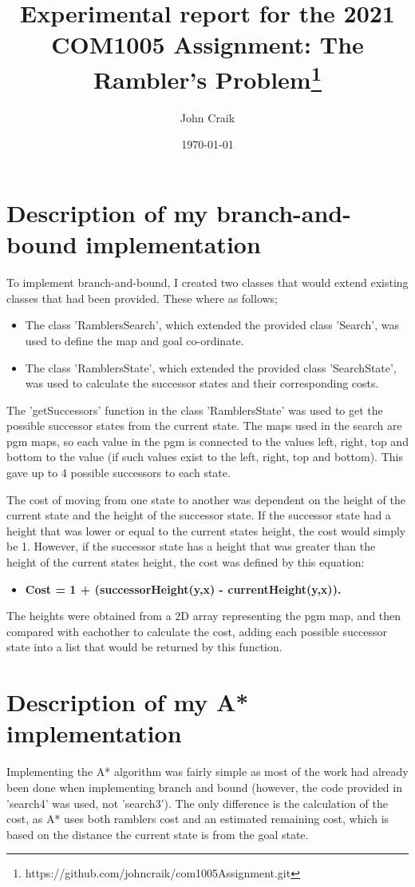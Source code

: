 \documentclass[11pt,oneside]{article}
\title{Experimental report for the 2021 COM1005 Assignment: The Rambler's Problem\footnote{https://github.com/johncraik/com1005Assignment.git}}
\author{John Craik}
\date{\today}
\begin{document}
\maketitle

\section{Description of my branch-and-bound implementation}
To implement branch-and-bound, I created two classes that would extend existing classes that had been provided. These where as follows;
\begin{itemize}
    \item The class 'RamblersSearch', which extended the provided class 'Search', was used to define the map and goal co-ordinate.
    \item The class 'RamblersState', which extended the provided class 'SearchState', was used to calculate the successor states and their corresponding costs.
\end{itemize}
The 'getSuccessors' function in the class 'RamblersState' was used to get the possible successor states from the current state. The maps used in the search are pgm maps, so each value in the pgm is connected to the values left, right, top and bottom to the value (if such values exist to the left, right, top and bottom). This gave up to 4 possible successors to each state.

The cost of moving from one state to another was dependent on the height of the current state and the height of the successor state. If the successor state had a height that was lower or equal to the current states height, the cost would simply be 1. However, if the successor state has a height that was greater than the height of the  current states height, the cost was defined by this equation:
\begin{itemize}
    \item \textbf{Cost = 1 + (successorHeight(y,x) - currentHeight(y,x)).}
\end{itemize}
The heights were obtained from a 2D array representing the pgm map, and then compared with eachother to calculate the cost, adding each possible successor state into a list that would be returned by this function.


\section{Description of my A* implementation}
Implementing the A* algorithm was fairly simple as most of the work had already been done when implementing branch and bound (however, the code provided in 'search4' was used, not 'search3'). The only difference is the calculation of the cost, as A* uses both ramblers cost and an estimated remaining cost, which is based on the distance the current state is from the goal state.
\end{document}
